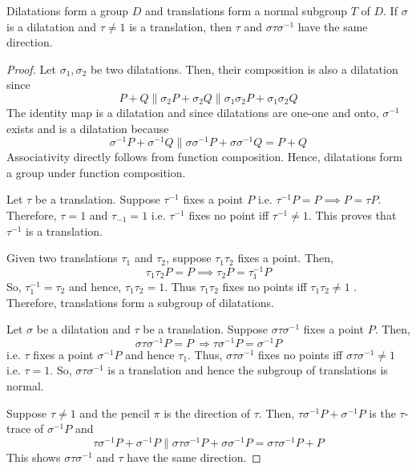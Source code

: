 \begin{theorem}
    Dilatations form a group $D$ and translations form a normal subgroup $T$ of $D$. If $\sigma$ is a dilatation and $\tau \neq 1$ is a translation, then $\tau$ and $\sigma \tau \sigma^{-1}$ have the same direction.
\end{theorem}
\begin{proof}
    Let $\sigma_1, \sigma_2$ be two dilatations. Then, their composition is also
    a dilatation since
    \[ P+Q \parallel \sigma_2 P + \sigma_2 Q \parallel \sigma_1 \sigma_2 P+ \sigma_1 \sigma_2 Q \]
    The identity map is a dilatation and since dilatations are one-one and onto, $\sigma^{-1}$ exists and is a dilatation because
    \[ \sigma^{-1}P+\sigma^{-1}Q \parallel \sigma\sigma^{-1}P+\sigma\sigma^{-1}Q = P+Q \]
    Associativity directly follows from function composition. Hence, dilatations form a group under function composition.

    Let $\tau$ be a translation. Suppose $\tau^{-1}$ fixes a point $P$ i.e. $\tau^{-1}P=P \implies P=\tau P$. Therefore, $\tau = 1$ and $\tau_{-1}=1$ i.e. $\tau^{-1}$ fixes no point iff $\tau^{-1} \neq 1$. This proves that $\tau^{-1}$ is a translation.

    \vspace{1ex}

    \noindent
    Given two translations $\tau_1$ and $\tau_2$, suppose $\tau_1 \tau_2$ fixes a point. Then,
    \[ \tau_1 \tau_2 P=P \implies \tau_2 P= \tau_1^{-1}P \]
    So, $\tau_1^{-1} =\tau_2$ and hence, $\tau_1 \tau_2=1$. Thus $\tau_1 \tau_2$ fixes no points iff $\tau_1 \tau_2 \neq 1$ .
    Therefore, translations form a subgroup of dilatations.

    \vspace{1ex}

    \noindent
    Let $\sigma$ be a dilatation and $\tau$ be a translation. Suppose $\sigma \tau \sigma^{-1}$ fixes a point $P$. Then,
    \[ \sigma \tau \sigma^{-1}P=P \: \Rightarrow \tau \sigma^{-1}P=\sigma^{-1}P \]
    i.e. $\tau$ fixes a point $\sigma^{-1}P$ and hence $\tau_1$. Thus, $\sigma \tau \sigma^{-1}$ fixes no points iff $\sigma \tau \sigma^{-1} \neq 1$ i.e. $\tau = 1$. So, $\sigma \tau \sigma^{-1}$ is a translation and hence the subgroup of translations is normal.

    \vspace{1ex}

    \noindent
    Suppose $\tau \neq 1$ and the pencil $\pi$ is the direction of $\tau$. Then, $\tau \sigma^{-1}P+\sigma^{-1}P$ is the $\tau$-trace of $\sigma^{-1}P$ and
    \[ \tau \sigma^{-1}P+\sigma^{-1}P \parallel \sigma \tau \sigma^{-1}P+ \sigma \sigma^{-1}P = \sigma \tau \sigma^{-1}P+ P \]
    This shows $\sigma \tau \sigma^{-1}$ and $\tau$ have the same direction.
    
\end{proof}

